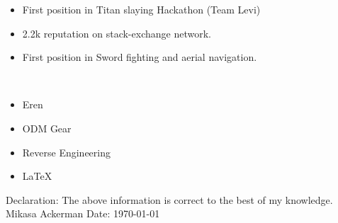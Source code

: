\documentclass[10pt]{extarticle}
\newcommand{\yourname}{Mikasa Ackerman}%
\begin{document}
\begin{contained}
\vspace{0pt}
\begin{itemize}
\vspace{-8pt}
    \setlength\itemsep{0.5pt}
    \item First position in Titan slaying Hackathon (Team Levi)
    \item 2.2k reputation on stack-exchange network.
    \item First position in Sword fighting and aerial navigation.
\end{itemize}
\vspace{0pt}
\end{contained}
\begin{contained}\\
\begin{itemize}
\vspace{-8pt}
    \setlength\itemsep{0.5pt}
    \item Eren
    \item ODM Gear
    \item Reverse Engineering
    \item \LaTeX
\end{itemize}
\end{contained}
Declaration: The above information is correct to the best of my knowledge.\newline
\yourname\newline
Date: \today
\end{document}
